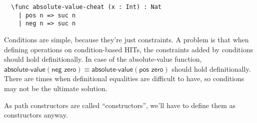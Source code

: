 \begin{verbatim}
  \func absolute-value-cheat (x : Int) : Nat
    | pos n => suc n
    | neg n => suc n
\end{verbatim}


Conditions are simple, because they're just constraints.
A problem is that when defining operations on condition-based HITs,
the constraints added by conditions should hold definitionally.
In case of the \textsf{absolute-value} function,
$\textsf{absolute-value}(\textsf{neg zero}) \equiv
\textsf{absolute-value}(\textsf{pos zero})$ should hold definitionally.
There are times when definitional equalities are difficult to have,
so conditions may not be the ultimate solution.

As path constructors are called ``constructors'',
we'll have to define them as constructors anyway.




